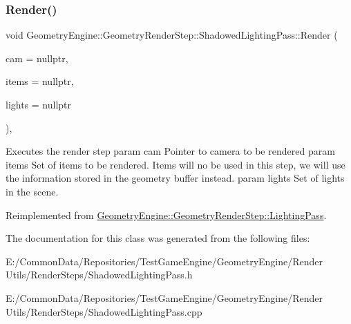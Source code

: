 \subsubsection{\texorpdfstring{Render()}{Render()}}
{\footnotesize\ttfamily void Geometry\+Engine\+::\+Geometry\+Render\+Step\+::\+Shadowed\+Lighting\+Pass\+::\+Render (\begin{DoxyParamCaption}\item[{\mbox{\hyperlink{class_geometry_engine_1_1_geometry_world_item_1_1_geometry_camera_1_1_camera}{Geometry\+World\+Item\+::\+Geometry\+Camera\+::\+Camera}} $\ast$}]{cam = {\ttfamily nullptr},  }\item[{std\+::unordered\+\_\+set$<$ \mbox{\hyperlink{class_geometry_engine_1_1_geometry_world_item_1_1_geometry_item_1_1_geometry_item}{Geometry\+World\+Item\+::\+Geometry\+Item\+::\+Geometry\+Item}} $\ast$ $>$ $\ast$}]{items = {\ttfamily nullptr},  }\item[{std\+::unordered\+\_\+set$<$ \mbox{\hyperlink{class_geometry_engine_1_1_geometry_world_item_1_1_geometry_light_1_1_light}{Geometry\+World\+Item\+::\+Geometry\+Light\+::\+Light}} $\ast$ $>$ $\ast$}]{lights = {\ttfamily nullptr} }\end{DoxyParamCaption})\hspace{0.3cm}{\ttfamily [override]}, {\ttfamily [virtual]}}

Executes the render step param cam Pointer to camera to be rendered param items Set of items to be rendered. Items will no be used in this step, we will use the information stored in the geometry buffer instead. param lights Set of lights in the scene. 

Reimplemented from \mbox{\hyperlink{class_geometry_engine_1_1_geometry_render_step_1_1_lighting_pass_ae6d9fa99f67e659839ca310947787f52}{Geometry\+Engine\+::\+Geometry\+Render\+Step\+::\+Lighting\+Pass}}.



The documentation for this class was generated from the following files\+:\begin{DoxyCompactItemize}
\item 
E\+:/\+Common\+Data/\+Repositories/\+Test\+Game\+Engine/\+Geometry\+Engine/\+Render Utils/\+Render\+Steps/Shadowed\+Lighting\+Pass.\+h\item 
E\+:/\+Common\+Data/\+Repositories/\+Test\+Game\+Engine/\+Geometry\+Engine/\+Render Utils/\+Render\+Steps/Shadowed\+Lighting\+Pass.\+cpp\end{DoxyCompactItemize}
